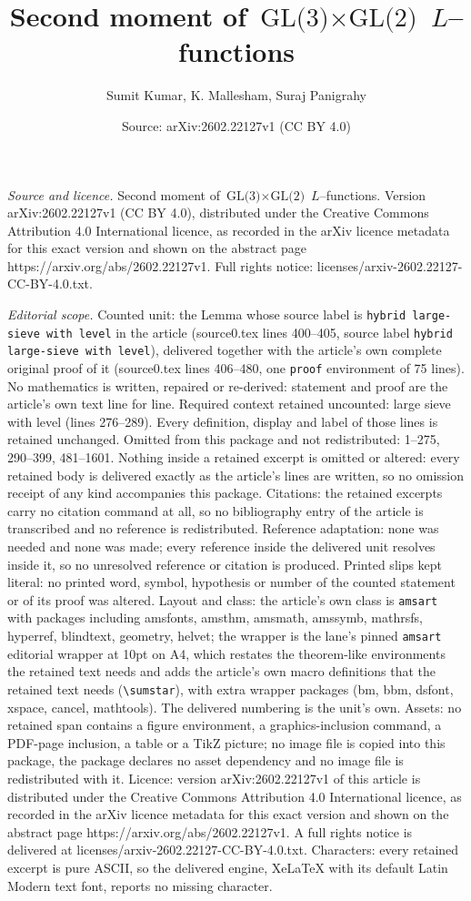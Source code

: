 \documentclass[10pt,a4paper]{amsart}
\title[Second moment of $\textrm{GL(3)} \times \textrm{GL(2)}$ $L$-]{Second moment of $\textrm{GL(3)} \times \textrm{GL(2)}$ $L$--functions}
\author{Sumit Kumar, K. Mallesham, Suraj Panigrahy}
\date{Source: arXiv:2602.22127v1 (CC BY 4.0)}
\begin{document}
\maketitle

\noindent\emph{Source and licence.} Second moment of $\textrm{GL(3)} \times \textrm{GL(2)}$ $L$--functions. Version arXiv:2602.22127v1 (CC BY 4.0), distributed under the Creative Commons Attribution 4.0 International licence, as recorded in the arXiv licence metadata for this exact version and shown on the abstract page https://arxiv.org/abs/2602.22127v1. Full rights notice: licenses/arxiv-2602.22127-CC-BY-4.0.txt.\par\smallskip

\noindent\textit{Editorial scope.} Counted unit: the Lemma whose source label is \texttt{hybrid large-sieve with level} in the article (source0.tex lines 400--405, source label \texttt{hybrid large-sieve with level}), delivered together with the article's own complete original proof of it (source0.tex lines 406--480, one \texttt{proof} environment of 75 lines). No mathematics is written, repaired or re-derived: statement and proof are the article's own text line for line. Required context retained uncounted: large sieve with level (lines 276--289). Every definition, display and label of those lines is retained unchanged. Omitted from this package and not redistributed: 1--275, 290--399, 481--1601. Nothing inside a retained excerpt is omitted or altered: every retained body is delivered exactly as the article's lines are written, so no omission receipt of any kind accompanies this package. Citations: the retained excerpts carry no citation command at all, so no bibliography entry of the article is transcribed and no reference is redistributed. Reference adaptation: none was needed and none was made; every reference inside the delivered unit resolves inside it, so no unresolved reference or citation is produced. Printed slips kept literal: no printed word, symbol, hypothesis or number of the counted statement or of its proof was altered. Layout and class: the article's own class is \texttt{amsart} with packages including amsfonts, amsthm, amsmath, amssymb, mathrsfs, hyperref, blindtext, geometry, helvet; the wrapper is the lane's pinned \texttt{amsart} editorial wrapper at 10pt on A4, which restates the theorem-like environments the retained text needs and adds the article's own macro definitions that the retained text needs (\texttt{\textbackslash sumstar}), with extra wrapper packages (bm, bbm, dsfont, xspace, cancel, mathtools). The delivered numbering is the unit's own. Assets: no retained span contains a figure environment, a graphics-inclusion command, a PDF-page inclusion, a table or a TikZ picture; no image file is copied into this package, the package declares no asset dependency and no image file is redistributed with it. Licence: version arXiv:2602.22127v1 of this article is distributed under the Creative Commons Attribution 4.0 International licence, as recorded in the arXiv licence metadata for this exact version and shown on the abstract page https://arxiv.org/abs/2602.22127v1. A full rights notice is delivered at licenses/arxiv-2602.22127-CC-BY-4.0.txt. Characters: every retained excerpt is pure ASCII, so the delivered engine, XeLaTeX with its default Latin Modern text font, reports no missing character.
\end{document}
